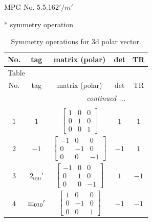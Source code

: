 \documentclass[fleqn,8pt]{jsarticle}
\begin{document}
\setcounter{MaxMatrixCols}{32}

\renewcommand{\tablename}{Table~}
\renewcommand{\figurename}{Figure~}
\begin{center}
\LARGE
MPG No. 5.5.16\quad$2'/m'$
\end{center}
* symmetry operation
\renewcommand{\arraystretch}{1.3}
\begin{longtable}{ccccc}
\caption{Symmetry operations for 3d polar vector.}
 \\
 \hline \hline
No. & tag & matrix (polar) & det & TR \\ \hline \endfirsthead

\multicolumn{4}{l}{\tablename\ \thetable{}} \\
 \hline \hline
No. & tag & matrix (polar) & det & TR \\ \hline \endhead

 \hline \hline
\multicolumn{4}{r}{\footnotesize\it continued ...} \\ \endfoot

 \hline \hline
\multicolumn{4}{r}{} \\ \endlastfoot

$ 1 $ & $ 1 $ & $ \begin{bmatrix} 1 & 0 & 0 \\ 0 & 1 & 0 \\ 0 & 0 & 1 \end{bmatrix} $ & $ 1 $ & $ 1 $ \\ \hline
$ 2 $ & $ -1 $ & $ \begin{bmatrix} -1 & 0 & 0 \\ 0 & -1 & 0 \\ 0 & 0 & -1 \end{bmatrix} $ & $ -1 $ & $ 1 $ \\ \hline
$ 3 $ & $ 2{}_{010}{}' $ & $ \begin{bmatrix} -1 & 0 & 0 \\ 0 & 1 & 0 \\ 0 & 0 & -1 \end{bmatrix} $ & $ 1 $ & $ -1 $ \\ \hline
$ 4 $ & $ {\rm m}_{010}{}' $ & $ \begin{bmatrix} 1 & 0 & 0 \\ 0 & -1 & 0 \\ 0 & 0 & 1 \end{bmatrix} $ & $ -1 $ & $ -1 $ \\
\end{longtable}
\end{document}
